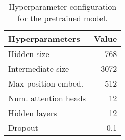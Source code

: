 \documentclass{../acl_latex.tex}
\begin{document}
\begin{table}[t]
\centering
\begin{tabular}{lr}
\toprule
Hyperparameters      & Value \\ \midrule
Hidden size          & 768   \\ 
Intermediate size    & 3072  \\
Max position embed.  & 512   \\
Num. attention heads & 12    \\
Hidden layers        & 12    \\
Dropout              & 0.1   \\ \bottomrule
\end{tabular}
\caption{
    Hyperparameter configuration for the \libertus{} pretrained model.
}
\label{table:pretrain_hyperparams}
\end{table}
\end{document}
